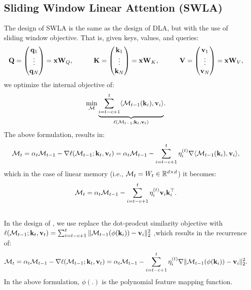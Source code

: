 \subsection{Sliding Window Linear Attention (SWLA)}
The design of SWLA is the same as the design of DLA, but with the use of sliding window objective. That is, given keys, values, and queries:
\begin{align}
    \mathbf{Q} = \begin{pmatrix} \mathbf{q}_1 \\ \vdots \\ \mathbf{q}_N
    \end{pmatrix}= \mathbf{x} \mathbf{W}_{Q}, \qquad \quad \mathbf{K} = \begin{pmatrix} \mathbf{k}_1 \\ \vdots \\ \mathbf{k}_N
    \end{pmatrix} = \mathbf{x} \mathbf{W}_{K}, \qquad \quad  \mathbf{V} = \begin{pmatrix} \mathbf{v}_1 \\ \vdots \\ \mathbf{v}_N
    \end{pmatrix} = \mathbf{x} \mathbf{W}_{V},
\end{align}
we optimize the internal objective of:
\begin{align}
    \min_{\mathcal{M}} \underset{\ell(\mathcal{M}_{t-1}; \mathbf{k}_t, \mathbf{v}_t)}{\underbrace{\sum_{i = t - c + 1}^{t}\langle \mathcal{M}_{t-1}(\mathbf{k}_i), \mathbf{v}_i \rangle}}.
\end{align}
The above formulation, results in:
\begin{align}
     \mathcal{M}_{t} = \alpha_t \mathcal{M}_{t-1}  - \nabla \ell(\mathcal{M}_{t-1}; \mathbf{k}_t, \mathbf{v}_t) = \alpha_t \mathcal{M}_{t-1}  - \sum_{i = t - c + 1}^{t}  \eta^{(t)}_i \nabla \langle \mathcal{M}_{t-1}(\mathbf{k}_i), \mathbf{v}_i \rangle,
\end{align}
which in the case of linear memory (i.e., $\mathcal{M}_t = W_t \in \mathbb{R}^{d \times d}$) it becomes:
\begin{align}
    \mathcal{M}_{t} = \alpha_t \mathcal{M}_{t-1}  - \sum_{i = t - c + 1}^{t} \eta^{(t)}_i  \mathbf{v}_i \mathbf{k}_i^{\top}.
\end{align}

\subsection{\omodel}
In the design of \omodel, we use replace the dot-prodcut similarity objective with $\ell(\mathcal{M}_{t-1}; \mathbf{k}_t, \mathbf{v}_t) = \sum_{i = t - c + 1}^{t} \| \mathcal{M}_{t-1}(\phi(\mathbf{k}_i)) - \mathbf{v}_i \|^{2}_2$ ,which results in the recurrence of:
\begin{align}
     \mathcal{M}_{t} = \alpha_t \mathcal{M}_{t-1}  - \nabla \ell(\mathcal{M}_{t-1}; \mathbf{k}_t, \mathbf{v}_t) = \alpha_t \mathcal{M}_{t-1}  - \sum_{i = t - c + 1}^{t}  \eta^{(t)}_i \nabla \| \mathcal{M}_{t-1}(\phi(\mathbf{k}_i)) - \mathbf{v}_i \|^{2}_2.
\end{align}
In the above formulation, $\phi(.)$ is the polynomial feature mapping function.


